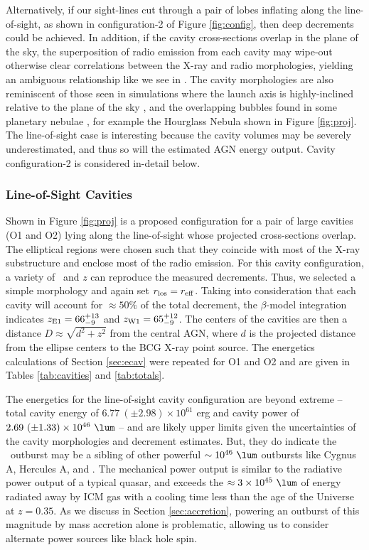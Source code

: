 \documentclass[iop]{emulateapj}
\begin{document}
Alternatively, if our sight-lines cut through a pair of lobes inflating
along the line-of-sight, as shown in configuration-2 of Figure
\ref{fig:config}, then deep decrements could be achieved. In addition,
if the cavity cross-sections overlap in the plane of the sky, the
superposition of radio emission from each cavity may wipe-out
otherwise clear correlations between the X-ray and radio morphologies,
yielding an ambiguous relationship like we see in \rbs. The cavity
morphologies are also reminiscent of those seen in simulations where
the launch axis is highly-inclined relative to the plane of the sky
\citep[\eg][]{2009MNRAS.395.2210B}, and the overlapping bubbles found
in some planetary nebulae \citep{1999AJ....118..468S}, for example the
Hourglass Nebula shown in Figure \ref{fig:proj}. The line-of-sight
case is interesting because the cavity volumes may be severely
underestimated, and thus so will the estimated AGN energy
output. Cavity configuration-2 is considered in-detail below.

\subsubsection{Line-of-Sight Cavities}

Shown in Figure \ref{fig:proj} is a proposed configuration for a pair
of large cavities (O1 and O2) lying along the line-of-sight whose
projected cross-sections overlap. The elliptical regions were chosen
such that they coincide with most of the X-ray substructure and
enclose most of the radio emission. For this cavity configuration, a
variety of \rlos\ and $z$ can reproduce the measured decrements. Thus,
we selected a simple morphology and again set $r_{\rm{los}} = r_{\rm{eff}}$. Taking
into consideration that each cavity will account for $\approx 50\%$ of
the total decrement, the $\beta$-model integration indicates
$z_{\rm{E1}} = 66^{+13}_{-9}$ and $z_{\rm{W1}} = 65^{+12}_{-9}$. The
centers of the cavities are then a distance $D \approx \sqrt{d^2+z^2}$
from the central AGN, where $d$ is the projected distance from the
ellipse centers to the BCG X-ray point source. The energetics
calculations of Section \ref{sec:ecav} were repeated for O1 and O2 and
are given in Tables \ref{tab:cavities} and \ref{tab:totals}.

The energetics for the line-of-sight cavity configuration are beyond
extreme -- total cavity energy of $6.77 ~(\pm 2.98) \times 10^{61}$
erg and cavity power of $2.69 ~(\pm 1.33) \times 10^{46} ~\lum$ -- and
are likely upper limits given the uncertainties of the cavity
morphologies and decrement estimates. But, they do indicate the
\rbs\ outburst may be a sibling of other powerful $\sim 10^{46} ~\lum$
outbursts like Cygnus A, Hercules A, and \ms. The mechanical power
output is similar to the radiative power output of a typical quasar,
and exceeds the $\approx 3 \times 10^{45} ~\lum$ of energy radiated
away by ICM gas with a cooling time less than the age of the Universe
at $z=0.35$. As we discuss in Section \ref{sec:accretion}, powering an
outburst of this magnitude by mass accretion alone is problematic,
allowing us to consider alternate power sources like black hole spin.
\end{document}
